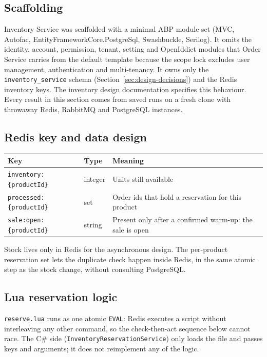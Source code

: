 \documentclass[a4paper]{report}
\begin{document}
\subsection{Scaffolding}

Inventory Service was scaffolded with a minimal ABP module set (MVC, Autofac,
EntityFrameworkCore.PostgreSql, Swashbuckle, Serilog). It omits the identity,
account, permission, tenant, setting and OpenIddict modules that Order Service
carries from the default template because the scope lock excludes user
management, authentication and multi-tenancy. It owns only the
\texttt{inventory\_service} schema
(Section~\ref{sec:design-decisions}) and the Redis inventory keys. The
inventory design documentation specifies this behaviour. Every result in
this section comes from saved runs on a fresh clone with throwaway Redis,
RabbitMQ and PostgreSQL instances.

\subsection{Redis key and data design}

\begin{center}
\begin{tabular}{@{}llp{6.8cm}@{}}
\toprule
Key & Type & Meaning \\
\midrule
\texttt{inventory:\{productId\}} & integer & Units still available \\
\texttt{processed:\{productId\}} & set & Order ids that hold a reservation for this product \\
\texttt{sale:open:\{productId\}} & string & Present only after a confirmed warm-up: the sale is open \\
\bottomrule
\end{tabular}
\end{center}

Stock lives only in Redis for the asynchronous design. The per-product
reservation set lets the duplicate check happen inside Redis, in the same
atomic step as the stock change, without consulting PostgreSQL.

\subsection{Lua reservation logic}

\texttt{reserve.lua} runs as one atomic \texttt{EVAL}: Redis
executes a script without interleaving any other command, so the
check-then-act sequence below cannot race. The C\# side
(\texttt{InventoryReservationService}) only loads the file and passes keys and
arguments; it does not reimplement any of the logic.
\end{document}
